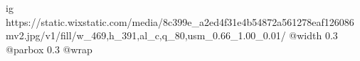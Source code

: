 
 
 
 
 

\ifcmt
  ig https://static.wixstatic.com/media/8c399e_a2ed4f31e4b54872a561278eaf126086~mv2.jpg/v1/fill/w_469,h_391,al_c,q_80,usm_0.66_1.00_0.01/%
  @width 0.3
  @parbox 0.3
  @wrap \parpic[r]
\fi
